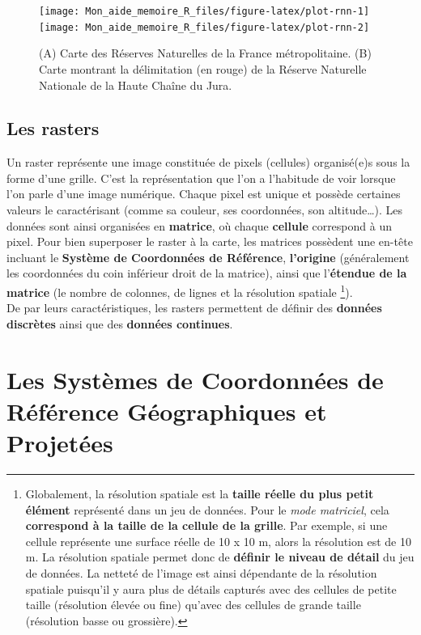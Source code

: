 \documentclass[
  french,
]{book}
\begin{document}
\begin{figure}

{\centering \texttt{[image: Mon\_aide\_memoire\_R\_files/figure-latex/plot-rnn-1]} \texttt{[image: Mon\_aide\_memoire\_R\_files/figure-latex/plot-rnn-2]} 

}

\caption{(A) Carte des Réserves Naturelles de la France métropolitaine. (B) Carte montrant la délimitation (en rouge) de la Réserve Naturelle Nationale de la Haute Chaîne du Jura.}\label{fig:plot-rnn}
\end{figure}

\hypertarget{rasters}{%
\subsection{Les rasters}\label{rasters}}

Un raster représente une image constituée de pixels (cellules) organisé(e)s sous
la forme d'une grille. C'est la représentation que l'on a l'habitude de voir
lorsque l'on parle d'une image numérique. Chaque pixel est unique et possède
certaines valeurs le caractérisant (comme sa couleur, ses coordonnées, son
altitude\ldots). Les données sont ainsi organisées en \textbf{matrice}, où chaque
\textbf{cellule} correspond à un pixel. Pour bien superposer le raster à la carte,
les matrices possèdent une en-tête incluant le \textbf{Système de Coordonnées de
Référence}, \textbf{l'origine} (généralement les coordonnées du coin inférieur droit
de la matrice), ainsi que l'\textbf{étendue de la matrice} (le nombre de colonnes, de
lignes et la résolution spatiale \footnote{Globalement, la résolution spatiale est la \textbf{taille réelle du
  plus petit élément} représenté dans un jeu de données. Pour le \emph{mode
  matriciel}, cela \textbf{correspond à la taille de la cellule de la grille}. Par
  exemple, si une cellule représente une surface réelle de 10 x 10 m, alors la
  résolution est de 10 m. La résolution spatiale permet donc de \textbf{définir le
  niveau de détail} du jeu de données. La netteté de l'image est ainsi dépendante
  de la résolution spatiale puisqu'il y aura plus de détails capturés avec des
  cellules de petite taille (résolution élevée ou fine) qu'avec des cellules de
  grande taille (résolution basse ou grossière).}).\\
De par leurs caractéristiques, les rasters permettent de définir des \textbf{données
discrètes} ainsi que des \textbf{données continues}.

\hypertarget{CRS}{%
\section{Les Systèmes de Coordonnées de Référence Géographiques et Projetées}\label{CRS}}
\end{document}
